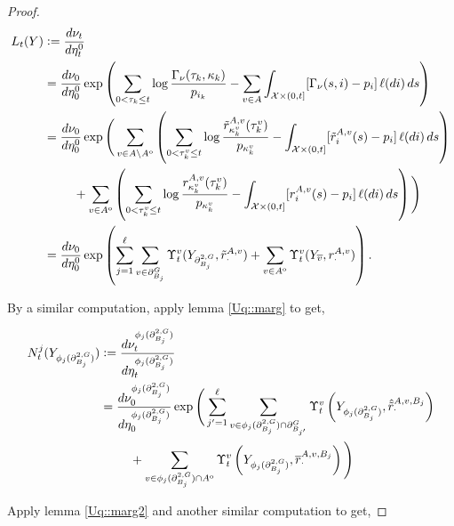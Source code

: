 \documentclass[12pt]{article}
\newcommand{\mc}{\mathcal}
\newcommand{\ov}{\overline}
\newcommand{\defeq}{:=}								%
\newcommand{\sta}{\mc{X}}							%
\newcommand{\gneigh}[2]{\partial^{#1}_{#2}}			%
\newcommand{\dgneigh}[2]{\partial^{2,#1}_{#2}}		%
\newcommand{\cl}[1]{\ov{#1}}						%
\newcommand{\indx}[1]{^{#1}}						%
\newcommand{\Sm}{\ell}								%
\newcommand{\rate}{r}								%
\newcommand{\vind}[1]{_{#1}}						%
\newcommand{\vpara}[1]{^{#1}}						%
\newcommand{\stpara}[1]{_{#1}}						%
\newcommand{\tpara}[1]{_{#1}}						%
\newcommand{\gvpara}[2]{^{#1,#2}}					%
\newcommand{\psize}{\ell}							%
\newcommand{\Xg}{Y}									%
\newcommand{\brate}{\alt{\rate}}					%
\newcommand{\inte}[1]{{#1}^\mathrm{o}}				%
\newcommand{\alt}[1]{\tilde{#1}}					%
\newcommand{\rt}{\tau}								%
\renewcommand{\mark}{\kappa}						%
\newcommand{\ratee}{\Gamma}							%
\newcommand{\mm}{\nu}								%
\newcommand{\bgrate}{\ov{\rate}}					%
\newcommand{\bcrate}{\hat{\brate}}					%
\newcommand{\mmm}{\eta}								%
\newcommand{\ds}{\Upsilon}							%
\newcommand{\dense}{L}								%
\newcommand{\densen}{N}								%
\newcommand{\gvjpara}[3]{^{#1,#2,#3}}				%
\newcommand{\prc}[1]{_{#1}}							%
\renewcommand{\it}[1]{_{#1}}						%
\newcommand{\jpara}[1]{^{#1}}						%
\begin{document}
\begin{proof}
\begin{align*}
\dense\tpara{t}(\Xg)&\defeq \frac{d\mm\tpara{t}}{d\mmm\tpara{t}\indx{0}}\\
&= \frac{d\mm\tpara{0}}{d\mmm\tpara{0}\indx{0}}\exp\left(\sum_{0< \rt\it{k}\leq t} \log\frac{\ratee\prc{\mm}(\rt\it{k},\mark\it{k})}{p_{i\it{k}}} - \sum_{v \in A}\int_{\sta\times (0,t]} [\ratee\prc{\mm}(s,i) - p_i]\,\Sm(di)\,ds\right)\\
&= \frac{d\mm\tpara{0}}{d\mmm\tpara{0}\indx{0}}\exp\Bigg(\sum_{v \in A\setminus\inte{A}}\left(\sum_{0 < \rt\it{k}\vpara{v}\leq t} \log\frac{\brate\gvpara{A}{v}\stpara{\mark\it{k}\vpara{v}}(\rt\it{k}\vpara{v})}{p_{\mark\it{k}\vpara{v}}} - \int_{\sta\times (0,t]} [\brate\gvpara{A}{v}\stpara{i}(s) - p_i]\,\Sm(di)\,ds\right) \\
&\hspace{24 pt} + \sum_{v \in \inte{A}}\left(\sum_{0 < \rt\it{k}\vpara{v}\leq t} \log\frac{\rate\gvpara{A}{v}\stpara{\mark\it{k}\vpara{v}}(\rt\it{k}\vpara{v})}{p_{\mark\it{k}\vpara{v}}} - \int_{\sta\times (0,t]} [\rate\gvpara{A}{v}\stpara{i}(s) - p_i]\,\Sm(di)\,ds\right)\Bigg)\\
&= \frac{d\mm\tpara{0}}{d\mmm\tpara{0}\indx{0}}\exp\left(\sum_{j=1}^{\psize}\sum_{v\in \gneigh{G}{B_j}} \ds\vpara{v}\tpara{t}(\Xg\vind{\dgneigh{G}{B_j}},\brate\gvpara{A}{v}\stpara{\cdot}) + \sum_{v\in\inte{A}}\ds\vpara{v}\tpara{t}(\Xg\vind{\cl{v}},\rate\gvpara{A}{v}\stpara{\cdot})\right).
\end{align*}

By a similar computation, apply lemma \ref{Uq::marg} to get,

\begin{align*}
\densen\jpara{j}\tpara{t}(\Xg\vind{\phi_j(\dgneigh{G}{B_j})}) &\defeq \frac{d\mm\vpara{\phi_j(\dgneigh{G}{B_j})}\tpara{t}}{d\mmm\vpara{\phi_j(\dgneigh{G}{B_j})}\tpara{t}}\\
&= \frac{d\mm\vpara{\phi_j(\dgneigh{G}{B_j})}\tpara{0}}{d\mmm\vpara{\phi_j(\dgneigh{G}{B_j})}\tpara{0}}\exp\Bigg(\sum_{j'=1}^\psize \sum_{v \in \phi_j(\dgneigh{G}{B_j})\cap \gneigh{G}{B_{j'}}} \ds\vpara{v}\tpara{t}\left(\Xg\vind{\phi_j(\dgneigh{G}{B_j})},\bcrate\gvjpara{A}{v}{B_j}\stpara{\cdot}\right)\\
&\hspace{24 pt} + \sum_{v \in \phi_j(\dgneigh{G}{B_j})\cap\inte{A}} \ds\vpara{v}\tpara{t}\left(\Xg\vind{\phi_j(\dgneigh{G}{B_j})},\bgrate\gvjpara{A}{v}{B_j}\stpara{\cdot}\right)\Bigg)
\end{align*}

Apply lemma \ref{Uq::marg2} and another similar computation to get,


\end{proof}
\end{document}

